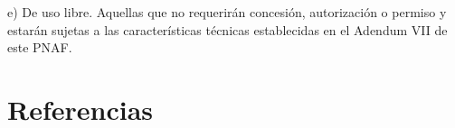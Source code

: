 \documentclass[conference]{IEEEtran}
\begin{document}
e) De uso libre.  Aquellas que no requerirán concesión,  autorización o permiso y
estarán sujetas a las características técnicas establecidas en el Adendum VII de este PNAF.

\section{Referencias}  %
\renewcommand{\refname}{}  %

\end{document}
